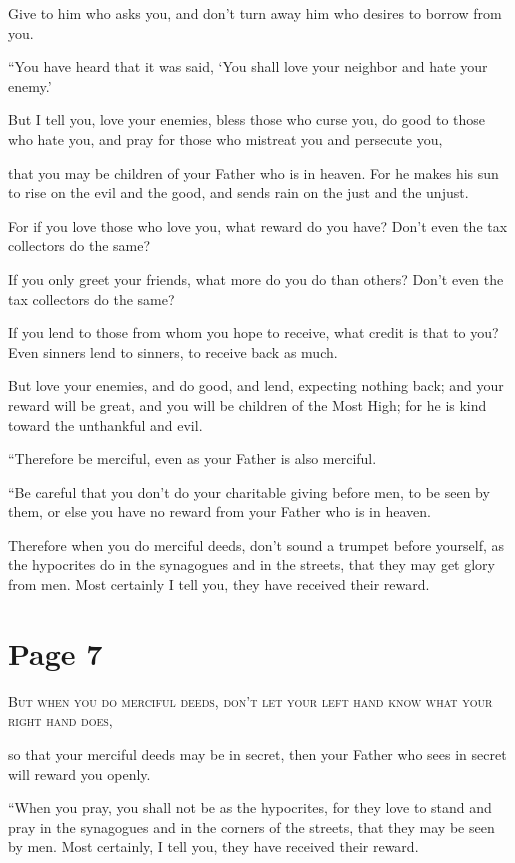 Give to him who asks you, and don’t turn away him who desires to borrow from you.

“You have heard that it was said, ‘You shall love your neighbor  and hate your enemy.’

But I tell you, love your enemies, bless those who curse you, do good to those who hate you, and pray for those who mistreat you and persecute you,

that you may be children of your Father who is in heaven. For he makes his sun to rise on the evil and the good, and sends rain on the just and the unjust.

For if you love those who love you, what reward do you have? Don’t even the tax collectors do the same?

If you only greet your friends, what more do you do than others? Don’t even the tax collectors do the same?

If you lend to those from whom you hope to receive, what credit is that to you? Even sinners lend to sinners, to receive back as much.

But love your enemies, and do good, and lend, expecting nothing back; and your reward will be great, and you will be children of the Most High; for he is kind toward the unthankful and evil.

“Therefore be merciful, even as your Father is also merciful.

“Be careful that you don’t do your charitable giving before men, to be seen by them, or else you have no reward from your Father who is in heaven.

Therefore when you do merciful deeds, don’t sound a trumpet before yourself, as the hypocrites do in the synagogues and in the streets, that they may get glory from men. Most certainly I tell you, they have received their reward.



\chapterornament
\section*{Page 7}

\lettrine{B}{ut when you do merciful deeds, don’t let your left hand know what your right hand does,}

so that your merciful deeds may be in secret, then your Father who sees in secret will reward you openly.

“When you pray, you shall not be as the hypocrites, for they love to stand and pray in the synagogues and in the corners of the streets, that they may be seen by men. Most certainly, I tell you, they have received their reward.

